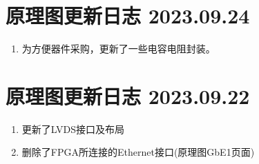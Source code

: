 \section*{原理图更新日志 2023.09.24}
\begin{enumerate}
  \item 为方便器件采购，更新了一些电容电阻封装。
\end{enumerate}
\section*{原理图更新日志 2023.09.22}
\begin{enumerate}
  \item 更新了LVDS接口及布局
  \item 删除了FPGA所连接的Ethernet接口(原理图GbE1页面)
\end{enumerate}

